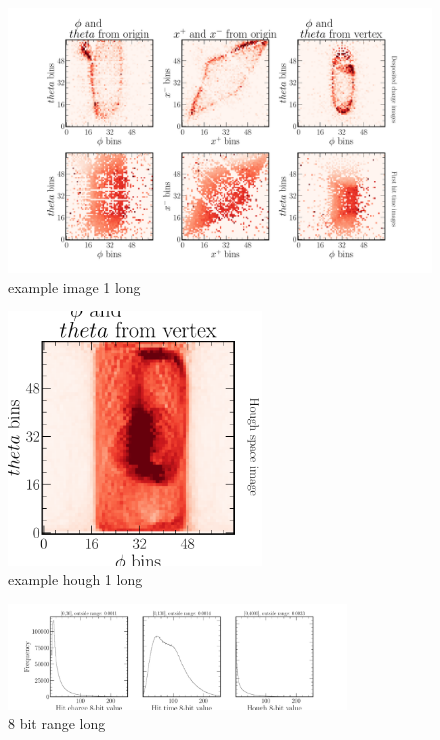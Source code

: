 \begin{figure}
    \includegraphics[width=\textwidth]{diagrams/6-cvn/chipsnet/example_image_1.pdf}
    \caption[example image 1 short]
    {example image 1 long}
    \label{fig:example_image_1}
\end{figure}

\begin{figure}
    \includegraphics[width=0.6\textwidth]{diagrams/6-cvn/chipsnet/example_hough_1.pdf}
    \caption[example hough 1 short]
    {example hough 1 long}
    \label{fig:example_hough_1}
\end{figure}

\begin{figure}
    \includegraphics[width=0.8\textwidth]{diagrams/6-cvn/chipsnet/8_bit_range.pdf}
    \caption[8 bit range short]
    {8 bit range long}
    \label{fig:8_bit_range}
\end{figure}

